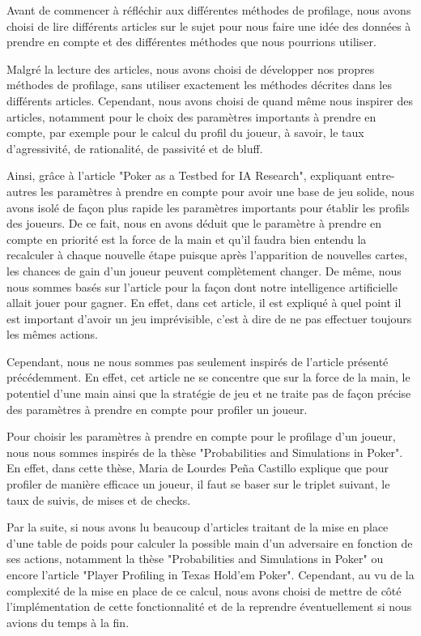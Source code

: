 \documentclass{report}
\begin{document}
\hspace{0.5cm}Avant de commencer à réfléchir aux différentes méthodes de profilage, nous avons choisi de lire différents articles sur le sujet pour nous faire une idée des données à prendre en compte et des différentes méthodes que nous pourrions utiliser. \par
Malgré la lecture des articles, nous avons choisi de développer nos propres méthodes de profilage, sans utiliser exactement les méthodes décrites dans les différents articles. Cependant, nous avons choisi de quand même nous inspirer des articles, notamment pour le choix des paramètres importants à prendre en compte, par exemple pour le calcul du profil du joueur, à savoir, le taux d'agressivité, de rationalité, de passivité et de bluff. \par
Ainsi, grâce à l'article "Poker as a Testbed for IA Research", expliquant entre-autres les paramètres à prendre en compte pour avoir une base de jeu solide, nous avons isolé de façon plus rapide les paramètres importants pour établir les profils des joueurs. De ce fait, nous en avons déduit que le paramètre à prendre en compte en priorité est la force de la main et qu'il faudra bien entendu la recalculer à chaque nouvelle étape puisque après l'apparition de nouvelles cartes, les chances de gain d'un joueur peuvent complètement changer. De même, nous nous sommes basés sur l'article pour la façon dont notre intelligence artificielle allait jouer pour gagner. En effet, dans cet article, il est expliqué à quel point il est important d'avoir un jeu imprévisible, c'est à dire de ne pas effectuer toujours les mêmes actions. \par
Cependant, nous ne nous sommes pas seulement inspirés de l'article présenté précédemment. En effet, cet article ne se concentre que sur la force de la main, le potentiel d'une main ainsi que la stratégie de jeu et ne traite pas de façon précise des paramètres à prendre en compte pour profiler un joueur. \par
Pour choisir les paramètres à prendre en compte pour le profilage d'un joueur, nous nous sommes inspirés de la thèse "Probabilities and Simulations in Poker". En effet, dans cette thèse, Maria de Lourdes Peña Castillo explique que pour profiler de manière efficace un joueur, il faut se baser sur le triplet suivant, le taux de suivis, de mises et de checks. \par

Par la suite, si nous avons lu beaucoup d'articles traitant de la mise en place d'une table de poids pour calculer la possible main d'un adversaire en fonction de ses actions, notamment la thèse "Probabilities and Simulations in Poker" ou encore l'article "Player Profiling in Texas Hold'em Poker". Cependant, au vu de la complexité de la mise en place de ce calcul, nous avons choisi de mettre de côté l'implémentation de cette fonctionnalité et de la reprendre éventuellement si nous avions du temps à la fin. \par
\end{document}
